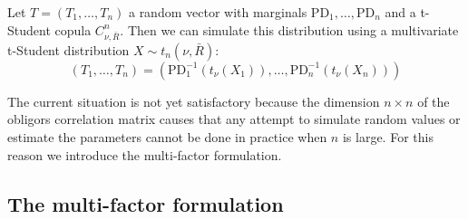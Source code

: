 \documentclass[11pt,fleqn]{book} %
\begin{document}
\begin{corollary}
	\label{cor:dts1}
	Let $T=(T_1, \dots, T_n)$ a random vector with marginals 
	$\text{PD}_1, \dots, \text{PD}_n$ and a t-Student copula $C_{\nu,\bar{R}}^n$. 
	Then we can simulate this distribution using a multivariate t-Student 
	distribution $X \sim t_n(\nu,\bar{R})$:
	\begin{displaymath}
		(T_1, \dots, T_n) = \left(\text{PD}_1^{-1}\left(t_{\nu}(X_1)\right), \dots, \text{PD}_n^{-1}\left(t_{\nu}(X_n)\right)\right)
	\end{displaymath}
\end{corollary}

The current situation is not yet satisfactory because the dimension 
$n {\times} n$ of the obligors correlation matrix causes that any 
attempt to simulate random values or estimate the parameters cannot 
be done in practice when $n$ is large. For this reason we introduce the
multi-factor formulation.

\subsection{The multi-factor formulation}
\end{document}
